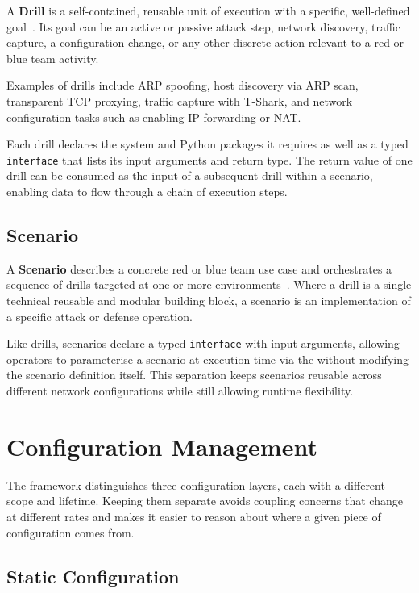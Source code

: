 A \textbf{Drill} is a self-contained, reusable unit of execution with a specific, well-defined goal~\cite{nsakRepository2026}.
Its goal can be an active or passive attack step, network discovery, traffic capture, a configuration change, or any other discrete action relevant to a red or blue team activity.

Examples of drills include \gls{ARP} spoofing, host discovery via \gls{ARP} scan, transparent \gls{TCP} proxying, traffic capture with T-Shark, and network configuration tasks such as enabling IP forwarding or \gls{NAT}.

Each drill declares the system and Python packages it requires as well as a typed \texttt{interface} that lists its input arguments and return type.
The return value of one drill can be consumed as the input of a subsequent drill within a scenario, enabling data to flow through a chain of execution steps.

\subsection{Scenario}\label{subsec:scenario-concept}

A \textbf{Scenario} describes a concrete red or blue team use case and orchestrates a sequence of drills targeted at one or more environments~\cite{nsakRepository2026}.
Where a drill is a single technical reusable and modular building block, a scenario is an implementation of a specific attack or defense operation.

Like drills, scenarios declare a typed \texttt{interface} with input arguments, allowing operators to parameterise a scenario at execution time via the  without modifying the scenario definition itself.
This separation keeps scenarios reusable across different network configurations while still allowing runtime flexibility.


\section{Configuration Management}\label{sec:configuration-management-concepts}

The  framework distinguishes three configuration layers, each with a different scope and lifetime.
Keeping them separate avoids coupling concerns that change at different rates and makes it easier to reason about where a given piece of configuration comes from.

\subsection{Static Configuration}\label{subsec:static-configuration-concept}

